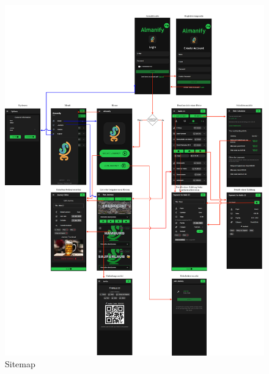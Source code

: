\begin{figure}[H]
    \centering
    \includegraphics[width=\textwidth]{img/Sitemap}
    \caption[Sitemap]{Sitemap}
    \label{fig:Sitemap}
\end{figure}
